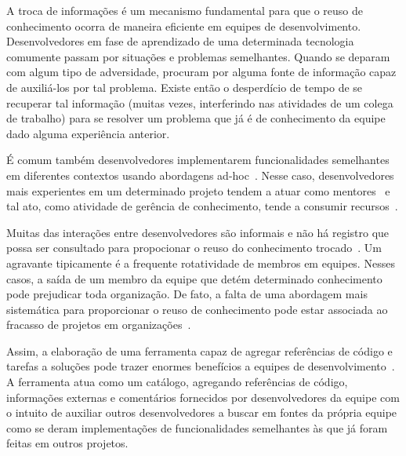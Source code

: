 A troca de informações é um mecanismo fundamental para que o reuso de conhecimento ocorra de maneira eficiente em equipes de desenvolvimento. Desenvolvedores em fase de aprendizado de uma determinada tecnologia comumente passam por situações e problemas semelhantes. Quando se deparam com algum tipo de adversidade, procuram por alguma fonte de informação capaz de auxiliá-los por tal problema. Existe então o desperdício de tempo de se recuperar tal informação (muitas vezes, interferindo nas atividades de um colega de trabalho) para se resolver um problema que já é de conhecimento da equipe dado alguma experiência anterior.


É comum também desenvolvedores implementarem funcionalidades semelhantes em diferentes contextos usando abordagens ad-hoc~\cite{SangMok2011}.
Nesse caso, desenvolvedores mais experientes em um determinado projeto tendem a atuar como mentores~\cite{CubraniC2004} e tal ato, como atividade de gerência de conhecimento, tende a consumir recursos~\cite{Wiig2003}. Muitas das interações entre desenvolvedores são informais e não há registro que possa ser consultado para propocionar o reuso do conhecimento trocado~\cite{Olson2000}. Um agravante tipicamente é a frequente rotatividade de membros em equipes. Nesses casos, a saída de um membro da equipe que detém determinado conhecimento pode prejudicar toda organização. De fato, a falta de uma abordagem mais sistemática para proporcionar o reuso de conhecimento pode estar associada ao fracasso de projetos em organizações~\cite{Hall2008}.



Assim, a elaboração de uma ferramenta capaz de agregar referências de código e tarefas a soluções pode trazer enormes benefícios a equipes de desenvolvimento~\cite{CubraniC2004}. A ferramenta atua como um catálogo, agregando referências de código, informações externas e comentários fornecidos por desenvolvedores da equipe com o intuito de auxiliar outros desenvolvedores a buscar em fontes da própria equipe como se deram implementações de funcionalidades semelhantes às que já foram feitas em outros projetos.

